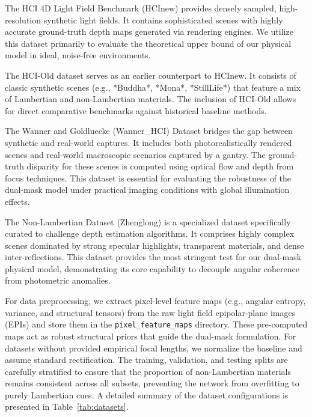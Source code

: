 \documentclass[lettersize,journal]{IEEEtran}
\begin{document}
The HCI 4D Light Field Benchmark (HCInew)  provides densely sampled, high-resolution synthetic light fields. It contains sophisticated scenes with highly accurate ground-truth depth maps generated via rendering engines. We utilize this dataset primarily to evaluate the theoretical upper bound of our physical model in ideal, noise-free environments. 

The HCI-Old dataset  serves as an earlier counterpart to HCInew. It consists of classic synthetic scenes (e.g., *Buddha*, *Mona*, *StillLife*) that feature a mix of Lambertian and non-Lambertian materials. The inclusion of HCI-Old allows for direct comparative benchmarks against historical baseline methods.

The Wanner and Goldluecke (Wanner\_HCI) Dataset  bridges the gap between synthetic and real-world captures. It includes both photorealistically rendered scenes and real-world macroscopic scenarios captured by a gantry. The ground-truth disparity for these scenes is computed using optical flow and depth from focus techniques. This dataset is essential for evaluating the robustness of the dual-mask model under practical imaging conditions with global illumination effects.

The Non-Lambertian Dataset (Zhenglong)  is a specialized dataset specifically curated to challenge depth estimation algorithms. It comprises highly complex scenes dominated by strong specular highlights, transparent materials, and dense inter-reflections. This dataset provides the most stringent test for our dual-mask physical model, demonstrating its core capability to decouple angular coherence from photometric anomalies.

For data preprocessing, we extract pixel-level feature maps (e.g., angular entropy, variance, and structural tensors) from the raw light field epipolar-plane images (EPIs)  and store them in the \texttt{pixel\_feature\_maps} directory. These pre-computed maps act as robust structural priors that guide the dual-mask formulation. For datasets without provided empirical focal lengths, we normalize the baseline and assume standard rectification. The training, validation, and testing splits are carefully stratified to ensure that the proportion of non-Lambertian materials remains consistent across all subsets, preventing the network from overfitting to purely Lambertian cues. A detailed summary of the dataset configurations is presented in Table~\ref{tab:datasets}.
\end{document}
